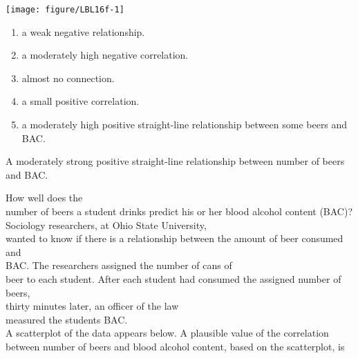 \documentclass[11pt]{book}\usepackage[]{graphicx}\usepackage[]{color}
\newenvironment{knitrout}{}{} %
\begin{document}
\begin{exercises}
\begin{exercise}
\begin{knitrout}\footnotesize
{}\color{fgcolor}

{\centering \texttt{[image: figure/LBL16f-1]} 

}



\end{knitrout}

      \begin{enumerate}
      \item a weak negative relationship.
      \item a moderately high negative correlation.
      \item almost no connection.
      \item a small positive correlation.
      \item a moderately high positive straight-line relationship between some beers and \\ BAC.
      \end{enumerate}
      \vspace{5mm}

  \end{exercise}
  \begin{solution}    %
  
    A moderately strong positive straight-line relationship between number of beers and BAC.
  
  \end{solution}

  \begin{exercise} %

    How well does the \\ number of beers a student drinks predict his or her
blood alcohol content (BAC)? Sociology researchers, at Ohio State University, \\ wanted to know if there is a relationship between the amount of beer consumed and \\ BAC. The researchers assigned the number of cans of \\ beer to each student. After each student had consumed the assigned number of beers, \\ thirty minutes later, an officer of the law \\ measured the students BAC.  \\ \cite{OSU2016}
A scatterplot of the data appears below.  A plausible value of the correlation between number of beers and blood alcohol content, based on the scatterplot, is


\end{exercise}
\end{exercises}
\end{document}
